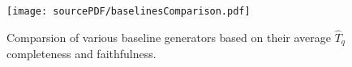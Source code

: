 \begin{figure}[ht]
\centering
\texttt{[image: sourcePDF/baselinesComparison.pdf]}
\vspace{-0.4cm}
\caption{Comparsion of various baseline generators based on their average $\hat{T}_q$ completeness and faithfulness.}
\vspace{-0.5cm}
\label{fig:baselines_fig}
\end{figure}